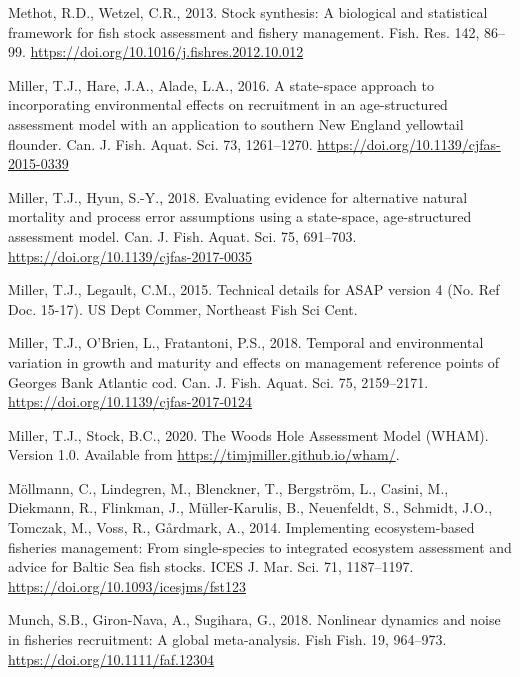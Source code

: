 \documentclass[]{article}
\begin{document}
\leavevmode\hypertarget{ref-methot2013Stock}{}%
Methot, R.D., Wetzel, C.R., 2013. Stock synthesis: A biological and
statistical framework for fish stock assessment and fishery management.
Fish. Res. 142, 86--99.
\url{https://doi.org/10.1016/j.fishres.2012.10.012}

\leavevmode\hypertarget{ref-miller2016Statespace}{}%
Miller, T.J., Hare, J.A., Alade, L.A., 2016. A state-space approach to
incorporating environmental effects on recruitment in an age-structured
assessment model with an application to southern New England yellowtail
flounder. Can. J. Fish. Aquat. Sci. 73, 1261--1270.
\url{https://doi.org/10.1139/cjfas-2015-0339}

\leavevmode\hypertarget{ref-miller2018Evaluating}{}%
Miller, T.J., Hyun, S.-Y., 2018. Evaluating evidence for alternative
natural mortality and process error assumptions using a state-space,
age-structured assessment model. Can. J. Fish. Aquat. Sci. 75, 691--703.
\url{https://doi.org/10.1139/cjfas-2017-0035}

\leavevmode\hypertarget{ref-miller2015Technical}{}%
Miller, T.J., Legault, C.M., 2015. Technical details for ASAP version 4
(No. Ref Doc. 15-17). US Dept Commer, Northeast Fish Sci Cent.

\leavevmode\hypertarget{ref-miller2018Temporal}{}%
Miller, T.J., O'Brien, L., Fratantoni, P.S., 2018. Temporal and
environmental variation in growth and maturity and effects on management
reference points of Georges Bank Atlantic cod. Can. J. Fish. Aquat. Sci.
75, 2159--2171. \url{https://doi.org/10.1139/cjfas-2017-0124}

\leavevmode\hypertarget{ref-miller2020Woods}{}%
Miller, T.J., Stock, B.C., 2020. The Woods Hole Assessment Model (WHAM). 
Version 1.0. Available from \url{https://timjmiller.github.io/wham/}.

\leavevmode\hypertarget{ref-mollmann2014Implementing}{}%
Möllmann, C., Lindegren, M., Blenckner, T., Bergström, L., Casini, M.,
Diekmann, R., Flinkman, J., Müller-Karulis, B., Neuenfeldt, S., Schmidt,
J.O., Tomczak, M., Voss, R., Gårdmark, A., 2014. Implementing
ecosystem-based fisheries management: From single-species to integrated
ecosystem assessment and advice for Baltic Sea fish stocks. ICES J. Mar.
Sci. 71, 1187--1197. \url{https://doi.org/10.1093/icesjms/fst123}

\leavevmode\hypertarget{ref-munch2018Nonlinear}{}%
Munch, S.B., Giron-Nava, A., Sugihara, G., 2018. Nonlinear dynamics and
noise in fisheries recruitment: A global meta-analysis. Fish Fish. 19,
964--973. \url{https://doi.org/10.1111/faf.12304}
\end{document}
